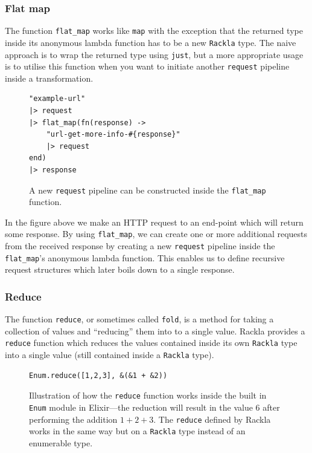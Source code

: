 \documentclass{cslthse-msc}
\begin{document}
\subsubsection{Flat map}
The function \lstinline{flat_map} works like \lstinline{map} with the exception that the returned type inside its anonymous lambda function has to be a new \lstinline{Rackla} type. The naive approach is to wrap the returned type using \lstinline{just}, but a more appropriate usage is to utilise this function when you want to initiate another \lstinline{request} pipeline inside a transformation.

\begin{figure}[H]
  \centering
\begin{lstlisting}[breaklines=true,frame=single]
"example-url"
|> request
|> flat_map(fn(response) -> 
	"url-get-more-info-#{response}" 
	|> request 
end)
|> response
\end{lstlisting}
  \caption{A new \lstinline{request} pipeline can be constructed inside the \lstinline{flat_map} function.}
\end{figure}

In the figure above we make an HTTP request to an end-point which will return some response. By using \lstinline{flat_map}, we can create one or more additional requests from the received response by creating a new \lstinline{request} pipeline inside the \lstinline{flat_map}'s anonymous lambda function. This enables us to define recursive request structures which later boils down to a single response.

\subsubsection{Reduce}
The function \lstinline{reduce}, or sometimes called \lstinline{fold}, is a method for taking a collection of values and \enquote{reducing} them into to a single value. Rackla provides a \lstinline{reduce} function which reduces the values contained inside its own \lstinline{Rackla} type into a single value (still contained inside a \lstinline{Rackla} type).

\begin{figure}[H]
  \centering
\begin{lstlisting}[breaklines=true,frame=single]
Enum.reduce([1,2,3], &(&1 + &2))
\end{lstlisting}
  \caption{Illustration of how the \lstinline{reduce} function works inside the built in \lstinline{Enum} module in Elixir---the reduction will result in the value $6$ after performing the addition $1+2+3$. The \lstinline{reduce} defined by Rackla works in the same way but on a \lstinline{Rackla} type instead of an enumerable type.}
\end{figure}
\end{document}
